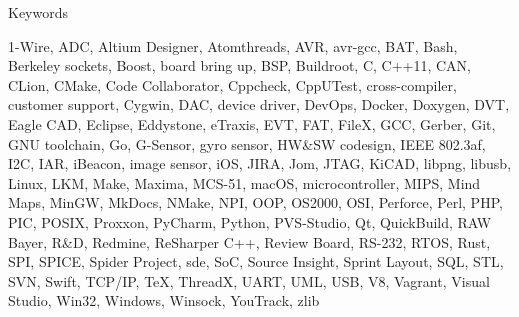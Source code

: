 \documentclass{template}
\begin{document}

\begin{rSection}{Keywords}

1-Wire, ADC, Altium Designer, Atomthreads, AVR, avr-gcc, BAT, Bash, Berkeley sockets, Boost, board bring up, BSP, Buildroot, C, C++11, CAN,
CLion, CMake, Code Collaborator, Cppcheck, CppUTest, cross-compiler, customer support, Cygwin, DAC, device driver, DevOps, Docker, Doxygen, DVT, Eagle CAD, Eclipse,
Eddystone, eTraxis, EVT, FAT, FileX, GCC, Gerber, Git, GNU toolchain, Go, G-Sensor, gyro sensor, HW\&SW codesign, IEEE 802.3af, I2C, IAR, iBeacon,
image sensor, iOS, JIRA, Jom, JTAG, KiCAD, libpng, libusb, Linux, LKM, Make, Maxima, MCS-51, macOS, microcontroller, MIPS, Mind Maps, MinGW,
MkDocs, NMake, NPI, OOP, OS2000, OSI, Perforce, Perl, PHP, PIC, POSIX, Proxxon, PyCharm, Python, PVS-Studio, Qt, QuickBuild, RAW Bayer, R\&D, Redmine, ReSharper
C++, Review Board, RS-232, RTOS, Rust, SPI, SPICE, Spider Project, sde, SoC, Source Insight, Sprint Layout, SQL, STL, SVN, Swift, TCP/IP, \TeX,
ThreadX, UART, UML, USB, V8, Vagrant, Visual Studio, Win32, Windows, Winsock, YouTrack, zlib

\end{rSection}

\end{document}
